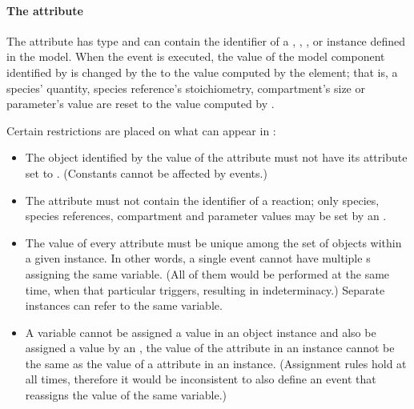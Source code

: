 \paragraph{The  attribute}

The \Event attribute  has type
 and can contain the identifier of a
\Compartment, \Species, \SpeciesReference, or \Parameter instance
defined in the model.  When the event is executed, the value of
the model component identified by  is changed by
the \EventAssignment to the value computed by the 
element; that is, a species' quantity, species reference's
stoichiometry, compartment's size or parameter's value are reset
to the value computed by .

Certain restrictions are placed on what can appear in
:
\begin{itemize}
  
\item The object identified by the value of the 
  attribute must not have its  attribute set 
  to .  (Constants cannot be affected by events.)
  
\item The  attribute must not contain the
  identifier of a reaction; only species, species references,
  compartment and parameter values may be set by an \Event.
  
\item The value of every  attribute must be unique
  among the set of \EventAssignment objects within a given
  \Event instance.  In other words, a single event cannot have
  multiple \EventAssignment{}s assigning the same variable.  (All
  of them would be performed at the same time, when that
  particular \Event triggers, resulting in indeterminacy.)
  Separate \Event instances can refer to the same variable.
  
\item A variable cannot be assigned a value in an \EventAssignment
  object instance and also be assigned a value by an
  \AssignmentRule, \ie the value of the  attribute
  in an \EventAssignment instance cannot be the same as the value
  of a  attribute in an \AssignmentRule instance.
  (Assignment rules hold at all times, therefore it would be
  inconsistent to also define an event that reassigns the value of
  the same variable.)

\end{itemize}

